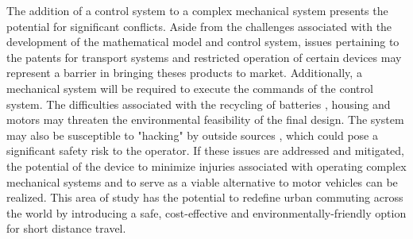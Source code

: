 \documentclass[12pt,letterpaper]{article}
\begin{document}
The addition of a control system to a complex mechanical system presents the potential for significant conflicts. 
Aside from the challenges associated with the development of the mathematical model and control system, issues pertaining to the patents for transport systems \cite{casterboardPatent} and restricted operation of certain devices \cite{TOLaws} may represent a barrier in bringing theses products to market. 
Additionally, a mechanical system will be required to execute the commands of the control system. 
The difficulties associated with the recycling of batteries \cite{BatteryRecharge}, housing \cite{PlasticAssessment} and motors may threaten the environmental feasibility of the final design. 
The system may also be susceptible to "hacking" by outside sources \cite{DEFCON}, which could pose a significant safety risk to the operator. 
If these issues are addressed and mitigated, the potential of the device to minimize injuries associated with operating complex mechanical systems and to serve as a viable alternative to motor vehicles can be realized. 
This area of study has the potential to redefine urban commuting across the world by introducing a safe, cost-effective and environmentally-friendly option for short distance travel. 



\newpage
{}

\end{document}
